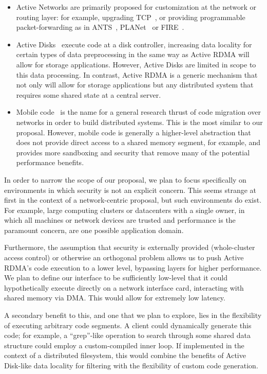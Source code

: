 \documentclass[10pt]{article}
\begin{document}
\begin{itemize} \itemsep -2pt

\item Active Networks are primarily proposed for customization at the
  network or routing layer: for example, upgrading TCP~\cite{AN-tcp},
  or providing programmable packet-forwarding as in ANTS~\cite{ANTS},
  PLANet~\cite{planet} or FIRE~\cite{FIRE}.

\item Active Disks~\cite{AD2,AD} execute code at a disk controller,
  increasing data locality for certain types of data preprocessing in
  the same way as Active RDMA will allow for storage
  applications. However, Active Disks are limited in scope to this
  data processing. In contrast, Active RDMA is a generic mechanism
  that not only will allow for storage applications but any
  distributed system that requires some shared state at a central
  server.

\item Mobile code~\cite{mobile} is the name for a general research
  thrust of code migration over networks in order to build distributed
  systems. This is the most similar to our proposal. However, mobile
  code is generally a higher-level abstraction that does not provide
  direct access to a shared memory segment, for example, and provides
  more sandboxing and security that remove many of the potential
  performance benefits.

\end{itemize}

In order to narrow the scope of our proposal, we plan to focus
specifically on environments in which security is not an explicit
concern. This seems strange at first in the context of a
network-centric proposal, but such environments do exist. For example,
large computing clusters or datacenters with a single owner, in which
all machines or network devices are trusted and performance is the
paramount concern, are one possible application domain.

Furthermore, the assumption that security is externally provided
(whole-cluster access control) or otherwise an orthogonal problem
allows us to push Active RDMA's code execution to a lower level,
bypassing layers for higher performance. We plan to define our
interface to be sufficiently low-level that it could hypothetically
execute directly on a network interface card, interacting with shared
memory via DMA. This would allow for extremely low latency.

A secondary benefit to this, and one that we plan to explore, lies in
the flexibility of executing arbitrary code segments. A client could
dynamically generate this code; for example, a ``grep''-like operation
to search through some shared data structure could employ a
custom-compiled inner loop. If implemented in the context of a
distributed filesystem, this would combine the benefits of Active
Disk-like data locality for filtering with the flexibility of custom
code generation.
\end{document}
